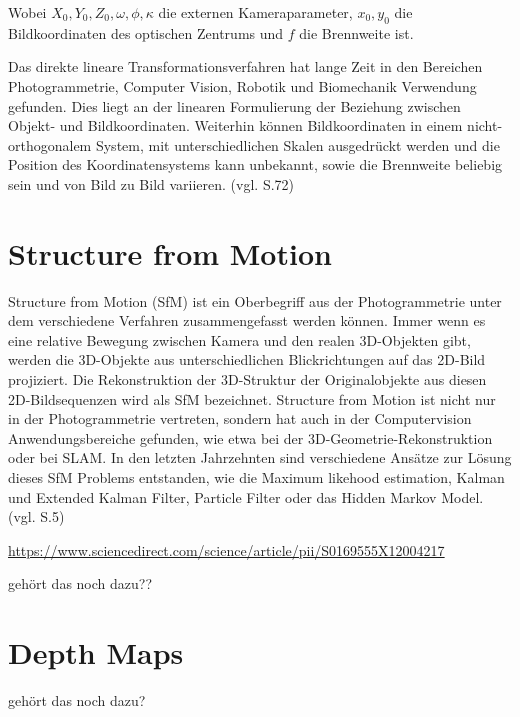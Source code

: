 Wobei $X_0,Y_0,Z_0,\omega ,\phi , \kappa $ die externen Kameraparameter, $x_0,y_0$ die Bildkoordinaten des optischen Zentrums und $f$ die Brennweite ist. 

Das direkte lineare Transformationsverfahren hat lange Zeit in den Bereichen Photogrammetrie, Computer Vision, Robotik und Biomechanik Verwendung gefunden. Dies liegt an der linearen Formulierung der Beziehung zwischen Objekt- und Bildkoordinaten. Weiterhin können Bildkoordinaten in einem nicht-orthogonalem System, mit unterschiedlichen Skalen ausgedrückt werden und die Position des Koordinatensystems kann unbekannt, sowie die Brennweite beliebig sein und von Bild zu Bild variieren. (vgl. \cite{dlt} S.72)


\section{Structure from Motion}

Structure from Motion (SfM) ist ein Oberbegriff aus der Photogrammetrie  unter dem verschiedene Verfahren zusammengefasst werden können. Immer wenn es eine relative Bewegung zwischen Kamera und den realen 3D-Objekten gibt, werden die 3D-Objekte aus unterschiedlichen Blickrichtungen auf das 2D-Bild projiziert. Die Rekonstruktion der 3D-Struktur der Originalobjekte aus diesen 2D-Bildsequenzen wird als SfM bezeichnet. Structure from Motion ist nicht nur in der Photogrammetrie vertreten, sondern hat auch in der Computervision Anwendungsbereiche gefunden, wie etwa bei der 3D-Geometrie-Rekonstruktion oder bei SLAM. In den letzten Jahrzehnten sind verschiedene Ansätze zur Lösung dieses SfM Problems entstanden, wie die \glqq Maximum likehood estimation\grqq{}, \glqq Kalman und Extended Kalman Filter\grqq{}, \glqq Particle Filter\grqq{} oder das \glqq Hidden Markov Model\grqq{}. (vgl. \cite{efficient_bundle} S.5)

\url{https://www.sciencedirect.com/science/article/pii/S0169555X12004217}

gehört das noch dazu??
\section{Depth Maps}
gehört das noch dazu?